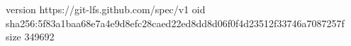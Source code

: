 version https://git-lfs.github.com/spec/v1
oid sha256:5f83a1baa68e7a4e9d8efc28caed22ed8dd8d06f0f4d23512f33746a7087257f
size 349692
